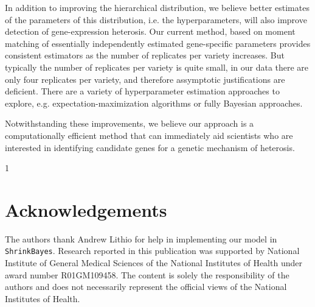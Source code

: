 \documentclass[useAMS,usenatbib,referee]{biom}
\newcommand{\blind}{1} %
\newcommand{\Stan}{Stan}
\newcommand{\ShrinkBayes}{{\tt ShrinkBayes}}
\begin{document}
In addition to improving the hierarchical distribution, we believe better estimates of the parameters of this distribution, i.e. the hyperparameters, will also improve detection of gene-expression heterosis. Our current method, based on moment matching of essentially independently estimated gene-specific parameters provides consistent estimators as the number of replicates per variety increases. But typically the number of replicates per variety is quite small, in our data there are only four replicates per variety, and therefore assymptotic justifications are deficient. There are a variety of hyperparameter estimation approaches to explore, e.g. expectation-maximization algorithms or fully Bayesian approaches.

Notwithstanding these improvements, we believe our approach is a computationally efficient method that can immediately aid scientists who are interested in identifying candidate genes for a genetic mechanism of heterosis. 





\backmatter %

\blind{
\section*{Acknowledgements}

The authors thank Andrew Lithio for help in implementing our model in \ShrinkBayes{}. Research reported in this publication was supported by National Institute of General Medical Sciences of the National Institutes of Health under award number R01GM109458. The content is solely the responsibility of the authors and does not necessarily represent the official views of the National Institutes of Health.
} \fi







\label{lastpage}
\end{document}
